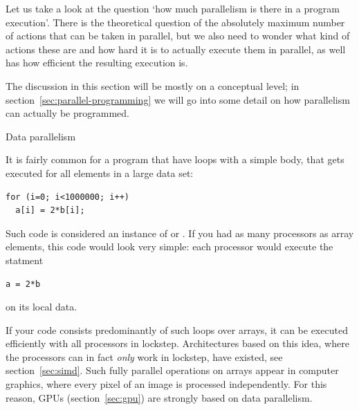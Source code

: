 
Let us take a look at the question `how much parallelism is there in a
program execution'. 
There is the theoretical question of the
absolutely maximum number of actions that can be taken in parallel,
but we also need to wonder what kind of actions these are and how hard
it is to actually execute them in parallel, as well has how efficient
the resulting execution is.

The discussion in this section will be mostly on a conceptual level;
in section~\ref{sec:parallel-programming} we will go into some detail
on how parallelism can actually be programmed.

 {Data parallelism}
\label{sec:data-parallel}

It is fairly common for a program that have loops with a simple body,
that gets executed for all elements in a large data set:
\begin{verbatim}
for (i=0; i<1000000; i++)
  a[i] = 2*b[i];
\end{verbatim}
Such code is considered an instance of
 or
. If you had as many
processors as array elements, this code would look very simple: each
processor would execute the statment
\begin{verbatim}
a = 2*b
\end{verbatim}
on its local data. 

If your code consists predominantly of such loops
over arrays, it can be executed efficiently with all processors in
lockstep. Architectures based on this idea, where the processors can
in fact \emph{only} work in lockstep, have existed, see
section~\ref{sec:simd}. Such fully parallel operations on arrays 
appear in computer graphics, where every pixel of an image is processed
independently. For this reason, \acp{GPU}
(section~\ref{sec:gpu})
are strongly based on data parallelism.

